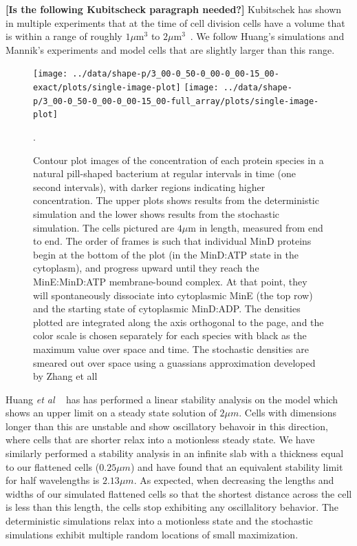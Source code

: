 \documentclass[letterpaper,twocolumn,amsmath,amssymb,pre]{revtex4-1}
\newcommand{\red}[1]{{\bf \color{red} #1}}
\newcommand{\fixme}[1]{\red{[#1]}}
\newcommand\micron{\ensuremath{\mu\text{m}}}
\begin{document}

\fixme{Is the following Kubitscheck paragraph needed?}
Kubitschek has shown in multiple experiments that at the time of cell
division cells have a volume that is within a range of roughly
$1\micron^3$ to $2\micron^3$~\cite{kubitschek1990cell,
  kubitschek1968linear}.  We follow Huang's
simulations\cite{huang2003dynamic} and Mannik's experiments and model
cells that are slightly larger than this range.

\begin{figure}
  \texttt{[image: ../data/shape-p/3\_00-0\_50-0\_00-0\_00-15\_00-exact/plots/single-image-plot]}
  \texttt{[image: ../data/shape-p/3\_00-0\_50-0\_00-0\_00-15\_00-full\_array/plots/single-image-plot]}
  \caption{Contour plot images of the concentration of each protein
    species in a natural pill-shaped bacterium at regular intervals in
    time (one second intervals), with darker regions indicating higher
    concentration. The upper plots shows results from the
    deterministic simulation and the lower shows results from the
    stochastic simulation.  The cells pictured are $4\micron$ in
    length, measured from end to end.  The order of frames is such
    that individual MinD proteins begin at the bottom of the plot (in
    the MinD:ATP state in the cytoplasm), and progress upward until
    they reach the MinE:MinD:ATP membrane-bound complex.  At that
    point, they will spontaneously dissociate into cytoplasmic MinE
    (the top row) and the starting state of cytoplasmic MinD:ADP.  The
    densities plotted are integrated along the axis orthogonal to the
    page, and the color scale is chosen separately for each species
    with black as the maximum value over space and time.  The
    stochastic densities are smeared out over space using a guassians
    approximation developed by Zhang et all~\cite{zhang2007gaussian}}.
  \label{image-p}
\end{figure}

Huang \emph{et al} ~\cite{huang2003dynamic} has has performed a linear
stability analysis on the model which shows an upper limit on a steady
state solution of $2\mu m$.  Cells with dimensions longer than this
are unstable and show oscillatory behavoir in this direction, where
cells that are shorter relax into a motionless steady state.  We have
similarly performed a stability analysis in an infinite slab with a
thickness equal to our flattened cells ($0.25\mu m$) and have found
that an equivalent stability limit for half wavelengths is $2.13\mu
m$. As expected, when decreasing the lengths and widths of our
simulated flattened cells so that the shortest distance across the
cell is less than this length, the cells stop exhibiting any
oscillalitory behavior.  The deterministic simulations relax into a
motionless state and the stochastic simulations exhibit multiple
random locations of small maximization.
\end{document}
